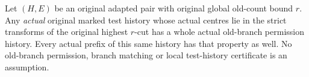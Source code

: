 \begin{theorem}
\label{hir:nc-highest-test-history-all-joint-permissions}
\leanok
Let $(H,E)$ be an original adapted pair with original global old-count
bound $r$. Any \emph{actual} original marked test history whose actual
centres lie in the strict transforms of the original highest $r$-cut
has a whole actual old-branch permission history. Every actual prefix
of this same history has that property as well. No old-branch
permission, branch matching or local test-history certificate is an
assumption.
\end{theorem}
